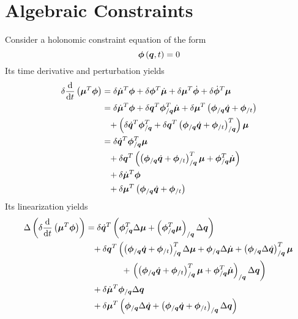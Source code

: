 \documentclass[10pt,dvips,fleqn,subeqn]{report}
\newcommand{\T}[1]{\bm{#1}}
\begin{document}
\section{Algebraic Constraints}
Consider a holonomic constraint equation of the form
\begin{equation}
	\T{\phi}\plbr{\T{q}, t} = 0 
\end{equation}
Its time derivative and perturbation yields
\begin{align}
	\delta\frac{\llk{d}}{\llk{d}t}\plbr{\T{\mu}^T\T{\phi}} &=
		\delta\dot{\T{\mu}}^T \T{\phi}
		+ \delta\T{\phi}^T \dot{\T{\mu}}
		+ \delta\T{\mu}^T \dot{\T{\phi}}
		+ \delta\dot{\T{\phi}}^T \T{\mu} \nonumber \\
	&= \delta\dot{\T{\mu}}^T \T{\phi}
		+ \delta\T{q}^T \T{\phi}_{/\T{q}}^T \dot{\T{\mu}}
		+ \delta\T{\mu}^T\plbr{
			\T{\phi}_{/\T{q}} \dot{\T{q}}
			+ \T{\phi}_{/t}
		} \nonumber \\
	&\hphantom{=} + \plbr{
			\delta\dot{\T{q}}^T \T{\phi}_{/\T{q}}^T
			+ \delta\T{q}^T \plbr{
				\T{\phi}_{/\T{q}} \dot{\T{q}}
				+ \T{\phi}_{/t}
			}_{/\T{q}}^T
		} \T{\mu} \nonumber \\
	&= \delta\dot{\T{q}}^T \T{\phi}_{/\T{q}}^T \T{\mu} \nonumber \\
	&\hphantom{=} + \delta\T{q}^T \plbr{
		\plbr{
			\T{\phi}_{/\T{q}} \dot{\T{q}}
			+ \T{\phi}_{/t}
		}_{/\T{q}}^T \T{\mu}
		+ \T{\phi}_{/\T{q}}^T \dot{\T{\mu}}
	} \nonumber \\
	&\hphantom{=} + \delta\dot{\T{\mu}}^T \T{\phi} \nonumber \\
	&\hphantom{=} + \delta\T{\mu}^T \plbr{
		\T{\phi}_{/\T{q}} \dot{\T{q}}
		+ \T{\phi}_{/t}
	}
\end{align}
Its linearization yields
\begin{align}
	\Delta\plbr{\delta\frac{\llk{d}}{\llk{d}t}\plbr{\T{\mu}^T\T{\phi}}}
	&= \delta\dot{\T{q}}^T \plbr{
		\T{\phi}_{/\T{q}}^T \Delta\T{\mu}
		+ \plbr{\T{\phi}_{/\T{q}}^T \T{\mu}}_{/\T{q}} \Delta\T{q}
	} \nonumber \\
	&\hphantom{=} + \delta\T{q}^T \lplbr{
		\plbr{
			\T{\phi}_{/\T{q}} \dot{\T{q}}
			+ \T{\phi}_{/t}
		}_{/\T{q}}^T \Delta \T{\mu}
		+ \T{\phi}_{/\T{q}} \Delta\dot{\T{\mu}}
		+ \plbr{\T{\phi}_{/\T{q}} \Delta\dot{\T{q}}}_{/\T{q}}^T \T{\mu}
	} \nonumber \\
	&\hphantom{=}\hspace{12mm} + \rplbr{
		\plbr{
			\plbr{
				\T{\phi}_{/\T{q}} \dot{\T{q}}
				+ \T{\phi}_{/t}
			}_{/\T{q}}^T \T{\mu}
			+ \T{\phi}_{/\T{q}}^T \dot{\T{\mu}}
		}_{/\T{q}} \Delta\T{q}
	} \nonumber \\
	&\hphantom{=} + \delta\dot{\T{\mu}}^T \T{\phi}_{/\T{q}} \Delta\T{q} \nonumber \\
	&\hphantom{=} + \delta\T{\mu}^T \plbr{
		\T{\phi}_{/\T{q}} \Delta\dot{\T{q}}
		+ \plbr{
			\T{\phi}_{/\T{q}} \dot{\T{q}}
			+ \T{\phi}_{/t}
		}_{/\T{q}} \Delta\T{q}
	}
\end{align}
\end{document}
